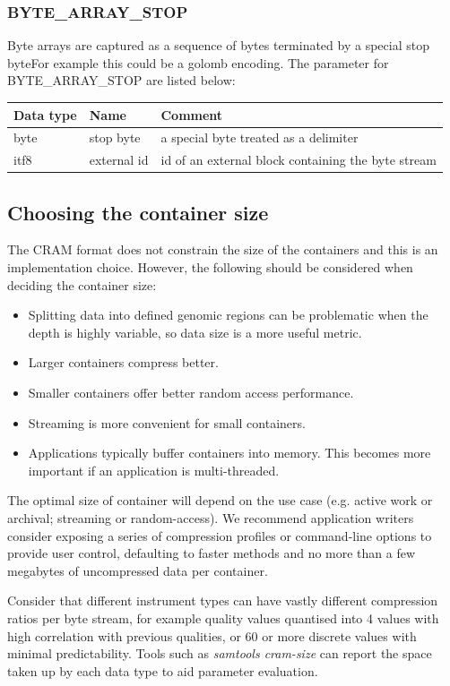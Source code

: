\documentclass[a4paper]{article}
\begin{document}
\subsubsection*{BYTE\_ARRAY\_STOP }

Byte arrays are captured as a sequence of bytes terminated by a special stop byteFor
example this could be a golomb encoding. The parameter for BYTE\_ARRAY\_STOP are 
listed below:

\begin{tabular}{|>{\raggedright}p{100pt}|>{\raggedright}p{100pt}|>{\raggedright}p{230pt}|}
\hline
\textbf{Data type} & \textbf{Name} & \textbf{Comment}
\tabularnewline
\hline
byte & stop byte & a special byte treated as a delimiter\tabularnewline
\hline
itf8 & external id & id of an external block containing the byte stream\tabularnewline
\hline
\end{tabular}

\subsection{\textbf{Choosing the container size}}

The CRAM format does not constrain the size of the containers and this is an implementation choice.
However, the following should be considered when deciding the container size:

\begin{itemize}
\item Splitting data into defined genomic regions can be problematic when the depth is highly variable, so data size is a more useful metric.

\item Larger containers compress better.

\item Smaller containers offer better random access performance.

\item Streaming is more convenient for small containers.

\item Applications typically buffer containers into memory.  This becomes more important if an application is multi-threaded.
\end{itemize}

The optimal size of container will depend on the use case (e.g. active work or archival; streaming or random-access).
We recommend application writers consider exposing a series of compression profiles or command-line options to provide user control, defaulting to faster methods and no more than a few megabytes of uncompressed data per container.

Consider that different instrument types can have vastly different compression ratios per byte stream, for example quality values quantised into 4 values with high correlation with previous qualities, or 60 or more discrete values with minimal predictability.
Tools such as \emph{samtools cram-size} can report the space taken up by each data type to aid parameter evaluation.

\newpage
\end{document}
